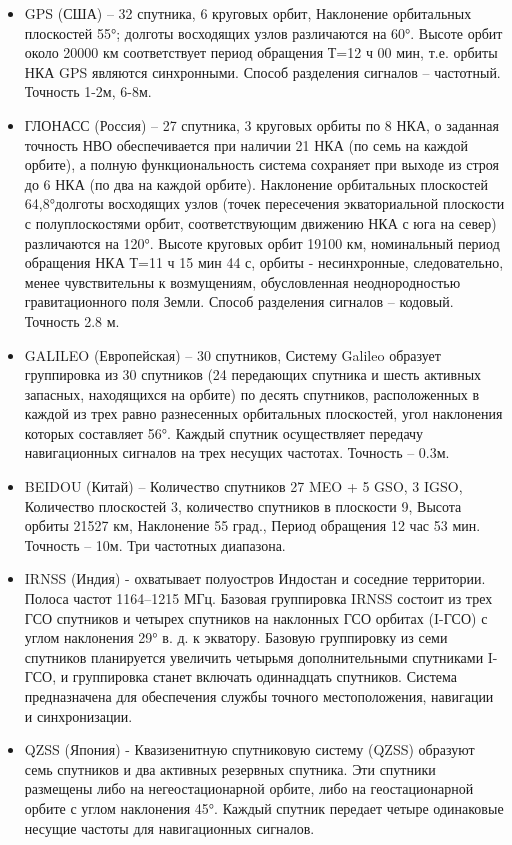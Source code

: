 \documentclass[14pt,a4paper,oneside]{extarticle}
\begin{document}
\begin{itemize}
    \item GPS (США) – 32 спутника, 6 круговых орбит, Наклонение орбитальных плоскостей  55°; долготы восходящих узлов различаются на 60°. Высоте орбит около 20000 км соответствует период обращения   Т=12 ч 00 мин, т.е. орбиты НКА GPS являются синхронными. Способ разделения сигналов – частотный. Точность 1-2м, 6-8м.
    \item ГЛОНАСС (Россия) – 27 спутника, 3 круговых орбиты по 8 НКА, о заданная точность НВО обеспечивается при наличии 21 НКА (по семь на каждой орбите), а полную функциональность система сохраняет при выходе из строя до 6 НКА (по два на каждой орбите). Наклонение  орбитальных  плоскостей 64,8°долготы  восходящих  узлов  (точек пересечения  экваториальной  плоскости  с полуплоскостями  орбит,  соответствующим  движению НКА с юга на север) различаются на 120°. Высоте круговых орбит 19100 км,  номинальный период обращения НКА Т=11 ч 15 мин 44 с, орбиты - несинхронные, следовательно, менее  чувствительны    к возмущениям,  обусловленная  неоднородностью гравитационного  поля  Земли. Способ разделения сигналов – кодовый. Точность 2.8 м.
    \item GALILEO (Европейская) – 30 спутников, Систему Galileo образует группировка из 30 спутников (24 передающих спутника и шесть активных запасных, находящихся на орбите) по десять спутников, расположенных в каждой из трех равно разнесенных орбитальных плоскостей, угол наклонения которых составляет 56°. Каждый спутник осуществляет передачу навигационных сигналов на трех несущих частотах. Точность – 0.3м.
    \item BEIDOU (Китай) – Количество спутников 27 MEO + 5 GSO, 3 IGSO, Количество плоскостей 3, количество спутников в плоскости 9, Высота орбиты 21527 км, Наклонение 55 град., Период обращения 12 час 53 мин. Точность – 10м. Три частотных диапазона. 
    \item IRNSS (Индия) - охватывает полуостров Индостан и соседние территории. Полоса частот 1164–1215 МГц. Базовая группировка IRNSS состоит из трех ГСО спутников и четырех спутников на наклонных ГСО орбитах (I-ГСО) с углом наклонения 29° в. д. к экватору. Базовую группировку из семи спутников планируется увеличить четырьмя дополнительными спутниками I-ГСО, и группировка станет включать одиннадцать спутников. Система предназначена для обеспечения службы точного местоположения, навигации и синхронизации.
    \item QZSS (Япония) - Квазизенитную спутниковую систему (QZSS) образуют семь спутников и два активных резервных  спутника. Эти спутники размещены либо на негеостационарной орбите, либо на геостационарной орбите с углом наклонения 45°. Каждый спутник передает четыре одинаковые несущие частоты для навигационных сигналов.
\end{itemize}
\end{document}
